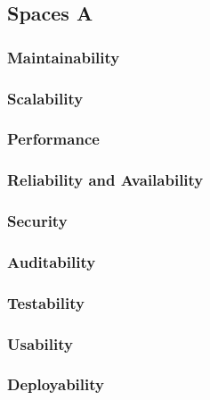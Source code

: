 
\subsection{Spaces A}

\subsubsection{Maintainability}

\subsubsection{Scalability}

\subsubsection{Performance}

\subsubsection{Reliability and Availability}

\subsubsection{Security}

\subsubsection{Auditability}

\subsubsection{Testability}

\subsubsection{Usability}

\subsubsection{Deployability}